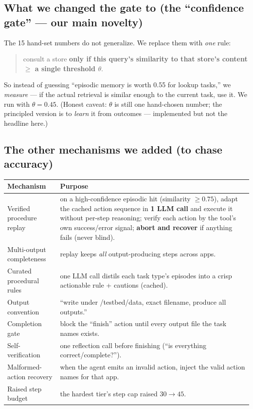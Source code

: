 \documentclass[11pt]{article}
\begin{document}
\subsection{What we changed the gate to (the ``confidence gate'' --- our main novelty)}
The 15 hand-set numbers do not generalize. We replace them with \emph{one} rule:
\begin{quote}
consult a store \textbf{only if this query's similarity to that store's content $\ge$ a single threshold $\theta$}.
\end{quote}
So instead of guessing ``episodic memory is worth 0.55 for lookup tasks,'' we \emph{measure} --- if the
actual retrieval is similar enough to the current task, use it. We run with $\theta = 0.45$. (Honest
caveat: $\theta$ is still one hand-chosen number; the principled version is to \emph{learn} it from
outcomes --- implemented but not the headline here.)

\subsection{The other mechanisms we added (to chase accuracy)}
\begin{center}
\begin{tabular}{@{}p{3.6cm}p{8.4cm}@{}}
\toprule
Mechanism & Purpose \\
\midrule
Verified procedure replay & on a high-confidence episodic hit (similarity $\ge 0.75$), adapt the cached
action sequence in \textbf{1 LLM call} and execute it without per-step reasoning; verify each action by
the tool's own success/error signal; \textbf{abort and recover} if anything fails (never blind). \\
Multi-output completeness & replay keeps \emph{all} output-producing steps across apps. \\
Curated procedural rules & one LLM call distils each task type's episodes into a crisp actionable rule + cautions (cached). \\
Output convention & ``write under /testbed/data, exact filename, produce all outputs.'' \\
Completion gate & block the ``finish'' action until every output file the task names exists. \\
Self-verification & one reflection call before finishing (``is everything correct/complete?''). \\
Malformed-action recovery & when the agent emits an invalid action, inject the valid action names for that app. \\
Raised step budget & the hardest tier's step cap raised $30 \to 45$. \\
\bottomrule
\end{tabular}
\end{center}
\end{document}
